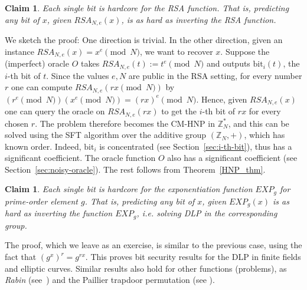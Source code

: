\documentclass[11pt]{article}
\newtheorem{claim}[theorem]{Claim}
\theoremstyle{definition}
\newcommand{\Z}{\mathbb{Z}}
\newcommand{\bit}{\text{bit}}
\begin{document}
\begin{claim}
    Each single bit is hardcore for the RSA function. That is, predicting any bit of $x$, given $RSA_{N,e}(x)$, is as hard as inverting the RSA function.
\end{claim}

We sketch the proof: One direction is trivial. In the other direction, given an instance $RSA_{N,e}(x) = x^e \pmod{N}$, we want to recover $x$. Suppose the (imperfect) oracle $O$ takes $RSA_{N,e}(t) := t^e \pmod{N}$ and outputs $\bit_i(t)$, the $i$-th bit of $t$. Since the values $e,N$ are public in the RSA setting, for every number $r$ one can compute $RSA_{N,e}(rx \pmod{N})$ by $(r^e  \pmod{N})(x^e \pmod{N}) = (rx)^e \pmod{N}$. Hence, given $RSA_{N,e}(x)$ one can query the oracle on $RSA_{N,e}(rx)$ to get the $i$-th bit of $rx$ for every chosen $r$.
The problem therefore becomes the CM-HNP in $\Z_N^*$, and this can be solved using the SFT algorithm over the additive group $(\Z_N, + )$, which has known order. Indeed, $\bit_i$ is concentrated (see Section~\ref{sec:i-th-bit}), thus has a significant coefficient. The oracle function $O$ also has a significant coefficient (see Section~\ref{sec:noisy-oracle}). The rest follows from Theorem~\ref{HNP_thm}.

\begin{claim}
    Each single bit is hardcore for the exponentiation function $EXP_g$ for prime-order element $g$. That is, predicting any bit of $x$, given $EXP_{g}(x)$ is as hard as inverting the function $EXP_g$, i.e. solving DLP in the corresponding group.
\end{claim}

The proof, which we leave as an exercise, is similar to the previous case, using the fact that $(g^x)^r = g^{rx}$.
This proves bit security results for the DLP in finite fields and elliptic curves.
Similar results also hold for other functions (problems), as \emph{Rabin} (see~\cite[Chapter 7]{AKA-thesis}) and the Paillier trapdoor permutation (see \cite[Section 7]{MR}).
\end{document}
